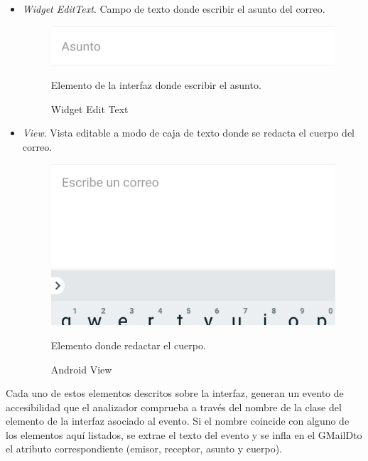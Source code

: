 \documentclass[12pt,a4paper,oneside]{book} %
\begin{document}
\begin{itemize}
\begin{itemize}
\item \textit{Widget EditText}. Campo de texto donde escribir el asunto del correo. 
 	\begin{figure}[H]
		\begin{center}
     		\includegraphics[scale=0.2]{pictures/IRL/GMail/nuevo_correo_gmail_asunto.png}
	    	\caption{Widget Edit Text}{Elemento de la interfaz donde escribir el asunto.}
    		\label{fig:Android Widget EditText}
		\end{center}
	\end{figure}


\item \textit{View}. Vista editable a modo de caja de texto donde se redacta el cuerpo del correo. 
 	\begin{figure}[H]
		\begin{center}
     		\includegraphics[scale=0.2]{pictures/IRL/GMail/nuevo_correo_gmail_cuerpo.png}
	    	\caption{Android View}{Elemento donde redactar el cuerpo.}
    		\label{fig:Android View}
		\end{center}
	\end{figure}
\end{itemize} %
Cada uno de estos elementos descritos sobre la interfaz, generan un evento de accesibilidad que el analizador comprueba a través del nombre de la clase del elemento de la interfaz asociado al evento. Si el nombre coincide con alguno de los elementos aquí listados, se extrae el texto del evento y se infla en el GMailDto el atributo correspondiente (emisor, receptor, asunto y cuerpo). 

\end{itemize}
\end{document}
